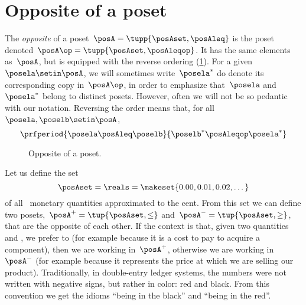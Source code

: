 
\section{Opposite of a poset}\label{sec:opposite-of-a-poset}

\begin{definition}
    \label{def:poset-opposite}
    The \emph{opposite} of a poset~$\posA=\tupp{\posAset, \posAleq}$ is the poset denoted~$\posA\op=\tupp{\posAset, \posAleqop}$.
    It has the same elements as~$\posA$, but is equipped with the reverse ordering (\cref{fig:poset-opposite}).
    For a given~$\posela \setin \posA$, we will sometimes write~$\posela^*$ do denote its corresponding copy in~$\posA\op$, in order to emphasize that~$\posela$ and~$\posela^*$ belong to distinct posets.
    However, often we will not be so pedantic with our notation.
    Reversing the order means that, for all~$\posela,\poselb \setin \posA$,
    \begin{equation}
        \prfperiod{
            \posela \posAleq \poselb
        }{
            \poselb^* \posAleqop \posela^*
        }
    \end{equation}
\end{definition}

\begin{figure}[tbh]
    \centering
    \caption{
        Opposite of a poset.
    }
    \label{fig:poset-opposite}
\end{figure}

\begin{example}
    Let us define the set
    \begin{equation}
        \posAset=\reals=\makeset{0.00,0.01,0.02,\dots}
    \end{equation}
    of all \CHFneutral \ monetary quantities approximated to the cent.
    From this set we can define two posets,~$\posA^{+} = \tup{\posAset, \leq}$ and~$\posA^{-} = \tup{\posAset, \geq}$, that are the opposite of each other.
    If the context is that, given two quantities \unit[1]{\CHFneutral} and \unit[2]{\CHFneutral}, we prefer \unit[1]{\CHFneutral} to \unit[2]{\CHFneutral} (for example because it is a cost to pay to acquire a component), then we are working in~$\posA^{+}$, otherwise we are working in~$\posA^{-}$ (for example because it represents the price at which we are selling our product).
    Traditionally, in double-entry ledger systems, the numbers were not written with negative signs, but rather in color: red and black.
    From this convention we get the idioms ``being in the black'' and ``being in the red''.
\end{example}
